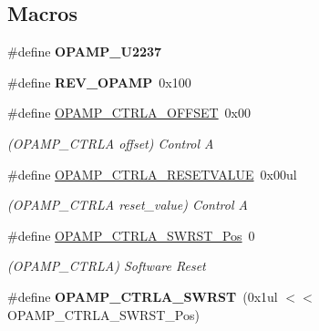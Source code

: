\subsection*{Macros}
\begin{DoxyCompactItemize}
\item 
\hypertarget{group___s_a_m_l21___o_p_a_m_p_ga7b047de032bbefcac736e139a68454bc}{}\#define {\bfseries O\+P\+A\+M\+P\+\_\+\+U2237}\label{group___s_a_m_l21___o_p_a_m_p_ga7b047de032bbefcac736e139a68454bc}

\item 
\hypertarget{group___s_a_m_l21___o_p_a_m_p_ga74de926b7bb69145d3d59b2038cf2a63}{}\#define {\bfseries R\+E\+V\+\_\+\+O\+P\+A\+M\+P}~0x100\label{group___s_a_m_l21___o_p_a_m_p_ga74de926b7bb69145d3d59b2038cf2a63}

\item 
\hypertarget{group___s_a_m_l21___o_p_a_m_p_ga73eaee8b50bd797a07a3cb0865b55d72}{}\#define \hyperlink{group___s_a_m_l21___o_p_a_m_p_ga73eaee8b50bd797a07a3cb0865b55d72}{O\+P\+A\+M\+P\+\_\+\+C\+T\+R\+L\+A\+\_\+\+O\+F\+F\+S\+E\+T}~0x00\label{group___s_a_m_l21___o_p_a_m_p_ga73eaee8b50bd797a07a3cb0865b55d72}

\begin{DoxyCompactList}\small\item\em (O\+P\+A\+M\+P\+\_\+\+C\+T\+R\+L\+A offset) Control A \end{DoxyCompactList}\item 
\hypertarget{group___s_a_m_l21___o_p_a_m_p_ga14195d8a1537a27477ac0dca52811577}{}\#define \hyperlink{group___s_a_m_l21___o_p_a_m_p_ga14195d8a1537a27477ac0dca52811577}{O\+P\+A\+M\+P\+\_\+\+C\+T\+R\+L\+A\+\_\+\+R\+E\+S\+E\+T\+V\+A\+L\+U\+E}~0x00ul\label{group___s_a_m_l21___o_p_a_m_p_ga14195d8a1537a27477ac0dca52811577}

\begin{DoxyCompactList}\small\item\em (O\+P\+A\+M\+P\+\_\+\+C\+T\+R\+L\+A reset\+\_\+value) Control A \end{DoxyCompactList}\item 
\hypertarget{group___s_a_m_l21___o_p_a_m_p_ga8289fd72f7c0dde8c2777477b9b90b49}{}\#define \hyperlink{group___s_a_m_l21___o_p_a_m_p_ga8289fd72f7c0dde8c2777477b9b90b49}{O\+P\+A\+M\+P\+\_\+\+C\+T\+R\+L\+A\+\_\+\+S\+W\+R\+S\+T\+\_\+\+Pos}~0\label{group___s_a_m_l21___o_p_a_m_p_ga8289fd72f7c0dde8c2777477b9b90b49}

\begin{DoxyCompactList}\small\item\em (O\+P\+A\+M\+P\+\_\+\+C\+T\+R\+L\+A) Software Reset \end{DoxyCompactList}\item 
\hypertarget{group___s_a_m_l21___o_p_a_m_p_ga4e9fdb0e552bd3e04dac407bfe5c6a79}{}\#define {\bfseries O\+P\+A\+M\+P\+\_\+\+C\+T\+R\+L\+A\+\_\+\+S\+W\+R\+S\+T}~(0x1ul $<$$<$ O\+P\+A\+M\+P\+\_\+\+C\+T\+R\+L\+A\+\_\+\+S\+W\+R\+S\+T\+\_\+\+Pos)\label{group___s_a_m_l21___o_p_a_m_p_ga4e9fdb0e552bd3e04dac407bfe5c6a79}


\end{DoxyCompactItemize}
